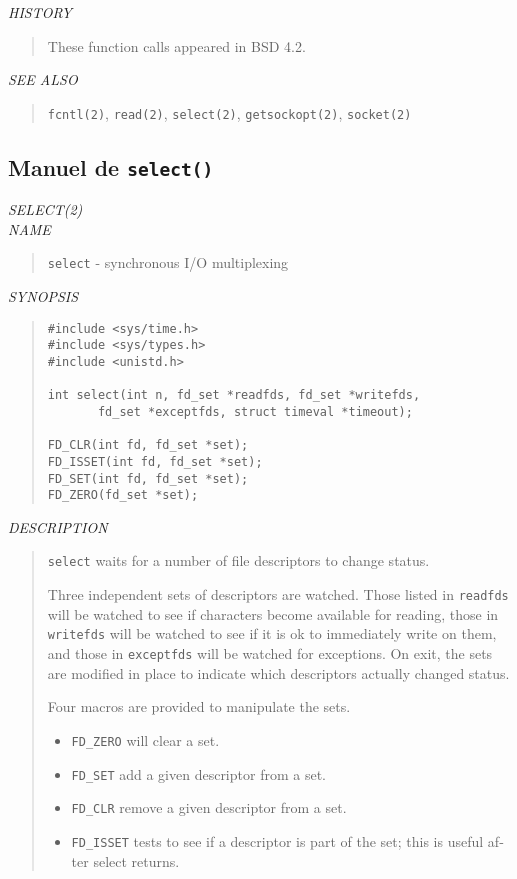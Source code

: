 \begin{appendix}
\begin{english}
{\sl HISTORY}
\begin{quote}
 	These function calls appeared in BSD 4.2.
\end{quote}

{\sl SEE ALSO}
\begin{quote}
	{\tt fcntl(2)}, {\tt read(2)}, {\tt select(2)}, {\tt getsockopt(2)},
	{\tt socket(2)}
\end{quote}
\end{english}

\subsection{Manuel de {\tt select()}}
\begin{english}
{\sl SELECT(2)}\\

{\sl NAME}
\begin{quote}
	{\tt select} - synchronous I/O multiplexing
\end{quote}

{\sl SYNOPSIS}
\begin{quote}
\begin{verbatim}
#include <sys/time.h>
#include <sys/types.h>
#include <unistd.h>

int select(int n, fd_set *readfds, fd_set *writefds,
       fd_set *exceptfds, struct timeval *timeout);

FD_CLR(int fd, fd_set *set);
FD_ISSET(int fd, fd_set *set);
FD_SET(int fd, fd_set *set);
FD_ZERO(fd_set *set);
\end{verbatim}
\end{quote}

{\sl DESCRIPTION}
\begin{quote}
	{\tt select} waits for a number of file descriptors to change status.

	Three independent sets of descriptors are watched. Those listed in
	{\tt readfds} will be watched to see if characters become available 
	for reading, those in {\tt writefds} will be watched to see if it is ok
	to immediately write on them, and those in {\tt exceptfds} will be
	watched for exceptions. On exit, the sets are modified in place 
	to indicate which descriptors actually changed status.

	Four macros are provided to manipulate the sets.
	\begin{itemize}
		\item {\tt FD\_ZERO} will clear a set.
		\item {\tt FD\_SET} add a given descriptor from a set.
		\item {\tt FD\_CLR} remove a given descriptor from a set.
		\item {\tt FD\_ISSET} tests to see if a descriptor is part
				of the set; this is useful after select returns.
	\end{itemize}


\end{quote}
\end{english}
\end{appendix}
